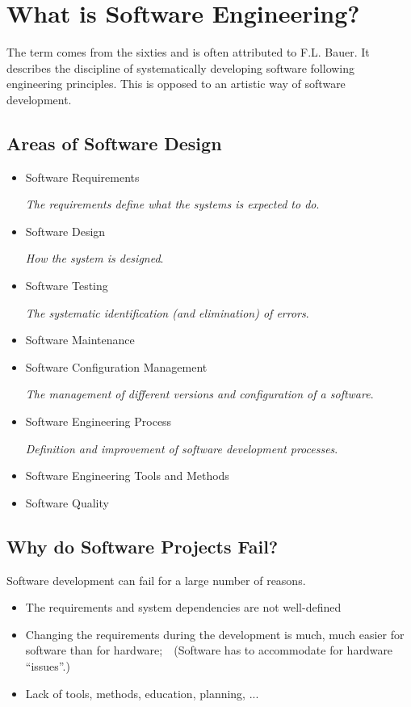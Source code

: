 \documentclass[english]{scrartcl}
\begin{document}
\section{What is Software Engineering?}

The term comes from the sixties and is often attributed to F.L. Bauer. It describes the discipline of systematically developing software following engineering principles. This is opposed to an artistic way of software development.

\subsection{Areas of Software Design}


\begin{itemize}
\item Software Requirements

\emph{The requirements define what the systems is expected to do}.
\item Software Design

\emph{How the system is designed}.
\item Software Testing

\emph{The systematic identification (and elimination) of errors}.
\item Software Maintenance
\item Software Configuration Management

\emph{The management of different versions and configuration of a software}.
\item Software Engineering Process

\emph{Definition and improvement of software development processes}.
\item Software Engineering Tools and Methods
\item Software Quality
\end{itemize}

\subsection{Why do Software Projects Fail?}

Software development can fail for a large number of reasons.

\begin{itemize}
\item The requirements and system dependencies are not well-defined
\item Changing the requirements during the development is much, much easier for software than for hardware;  
(Software has to accommodate for hardware “issues”.)
\item Lack of tools, methods, education, planning, ...
\end{itemize}
\end{document}
